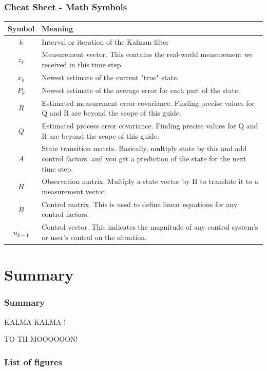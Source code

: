 \documentclass{beamer}
\begin{document}
\begin{frame}
    \frametitle{Cheat Sheet - Math Symbols}
    \scriptsize
    \begin{table}[h]
        \centering
        \begin{tabular}{|c|p{8cm}|}
            \hline
            \textbf{Symbol} & \textbf{Meaning}                                                                                                                                  \\ \hline
            \(k\)           & Interval or iteration of the Kalman filter                                                                                                        \\ \hline
            \(z_k\)         & Measurement vector. This contains the real-world measurement we received in this time step.                                                       \\ \hline
            \(x_k\)         & Newest estimate of the current "true" state.                                                                                                      \\ \hline
            \(P_k\)         & Newest estimate of the average error for each part of the state.                                                                                  \\ \hline
            \(R\)           & Estimated measurement error covariance. Finding precise values for Q and R are beyond the scope of this guide.                                    \\ \hline
            \(Q\)           & Estimated process error covariance. Finding precise values for Q and R are beyond the scope of this guide.                                        \\ \hline
            \(A\)           & State transition matrix. Basically, multiply state by this and add control factors, and you get a prediction of the state for the next time step. \\ \hline
            \(H\)           & Observation matrix. Multiply a state vector by H to translate it to a measurement vector.                                                         \\ \hline
            \(B\)           & Control matrix. This is used to define linear equations for any control factors.                                                                  \\ \hline
            \(u_{k-1}\)     & Control vector. This indicates the magnitude of any control system's or user's control on the situation.                                          \\ \hline
        \end{tabular}
    \end{table}
\end{frame}

\section{Summary}

\begin{frame}
    \frametitle{Summary}
    KALMA KALMA !
    
    \huge TO TH MOOOOOON!
\end{frame}

\begin{frame}
    \frametitle{List of figures}
    \listoffigures
\end{frame}
\end{document}
